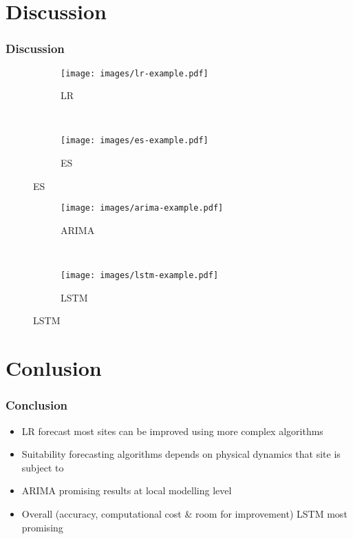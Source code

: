 \documentclass[10pt]{beamer}
\theoremstyle{remark}
\theoremstyle{definition}
\begin{document}
\section{Discussion}
\begin{frame}
\frametitle{Discussion}

	\begin{figure}
	\centering
	\begin{subfigure}[t]{0.5\textwidth}
		\centering
		\texttt{[image: images/lr-example.pdf]}
		\caption{LR}
	\end{subfigure}%
	~ 
	\begin{subfigure}[t]{0.5\textwidth}
		\centering
		\texttt{[image: images/es-example.pdf]}
		\caption{ES}
	\end{subfigure}
	\end{figure}

	\begin{figure}
	\centering
	\begin{subfigure}[t]{0.5\textwidth}
		\centering
		\texttt{[image: images/arima-example.pdf]}
		\caption{ARIMA}
	\end{subfigure}%
	~ 
	\begin{subfigure}[t]{0.5\textwidth}
		\centering
		\texttt{[image: images/lstm-example.pdf]}
		\caption{LSTM}
	\end{subfigure}
	\end{figure}	

\end{frame}

\section{Conlusion}
\begin{frame}
\frametitle{Conclusion}

\begin{itemize}[<+->]
	\item LR forecast most sites can be improved using more complex algorithms 
	\item Suitability forecasting algorithms depends on physical dynamics that site is subject to 
	\item ARIMA promising results at local modelling level 
	\item Overall (accuracy, computational cost \& room for improvement) LSTM most promising
\end{itemize}

\end{frame}
\end{document}
